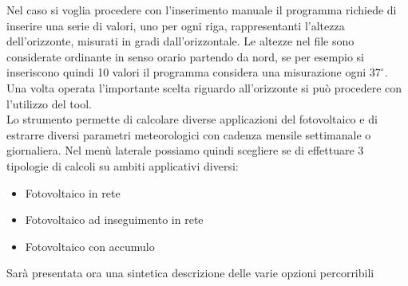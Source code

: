 Nel caso si voglia procedere con l'inserimento manuale il programma richiede di inserire una serie di valori, uno per ogni riga, rappresentanti l'altezza dell'orizzonte, misurati in gradi dall'orizzontale.
Le altezze nel file sono considerate ordinante in senso orario partendo da nord, se per esempio si inseriscono quindi 10 valori il programma considera una misurazione ogni $37^\circ$.\\
Una volta operata l'importante scelta riguardo all'orizzonte si può procedere con l'utilizzo del tool.\\
Lo strumento permette di calcolare diverse applicazioni del fotovoltaico e di estrarre diversi parametri meteorologici con cadenza mensile settimanale o giornaliera.
Nel menù laterale possiamo quindi scegliere se di effettuare 3 tipologie di calcoli su ambiti applicativi diversi:
\begin{itemize}
    \item Fotovoltaico in rete
    \item Fotovoltaico ad inseguimento in rete
    \item Fotovoltaico con accumulo
\end{itemize}
Sarà presentata ora una sintetica descrizione delle varie opzioni percorribili
